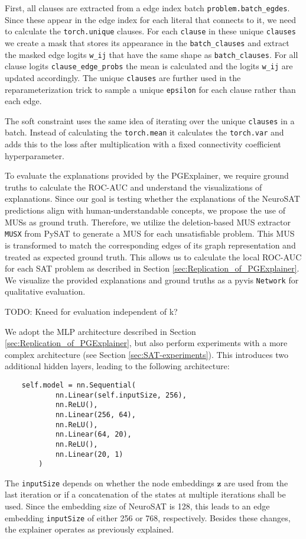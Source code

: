 First, all clauses are extracted from a edge index batch \verb|problem.batch_egdes|. Since these appear in the edge index for each literal that connects to it, we need to calculate the \verb|torch.unique| clauses. For each \verb|clause| in these unique \verb|clauses| we create a mask that stores its appearance in the \verb|batch_clauses| and extract the masked edge logits \verb|w_ij| that have the same shape as \verb|batch_clauses|. For all clause logits \verb|clause_edge_probs| the mean is calculated and the logits \verb|w_ij| are updated accordingly.
The unique \verb|clauses| are further used in the reparameterization trick to sample a unique \verb|epsilon| for each clause rather than each edge.

The soft constraint uses the same idea of iterating over the unique \verb|clauses| in a batch. Instead of calculating the \verb|torch.mean| it calculates the \verb|torch.var| and adds this to the loss after multiplication with a fixed connectivity coefficient hyperparameter. \bigskip

To evaluate the explanations provided by the PGExplainer, we require ground truths to calculate the ROC-AUC and understand the visualizations of explanations. Since our goal is testing whether the explanations of the NeuroSAT predictions align with human-understandable concepts, we propose the use of MUSs as ground truth. Therefore, we utilize the deletion-based MUS extractor \verb|MUSX| from PySAT \cite{imms-sat18} to generate a MUS for each unsatisfiable problem. This MUS is transformed to match the corresponding edges of its graph representation and treated as expected ground truth. This allows us to calculate the local ROC-AUC for each SAT problem as described in Section \ref{sec:Replication_of_PGExplainer}. We visualize the provided explanations and ground truths as a pyvis \cite{perrone2020network} \verb|Network| for qualitative evaluation. \bigskip

TODO: Kneed for evaluation independent of k?

We adopt the MLP architecture described in Section \ref{sec:Replication_of_PGExplainer}, but also perform experiments with a more complex architecture (see Section \ref{sec:SAT-experiments}). This introduces two additional hidden layers, leading to the following architecture:
\begin{verbatim}
    self.model = nn.Sequential(
            nn.Linear(self.inputSize, 256),
            nn.ReLU(),
            nn.Linear(256, 64),
            nn.ReLU(),
            nn.Linear(64, 20),
            nn.ReLU(),
            nn.Linear(20, 1)
        )
\end{verbatim}
The \verb|inputSize| depends on whether the node embeddings $\mathbf{z}$ are used from the last iteration or if a concatenation of the states at multiple iterations shall be used. Since the embedding size of NeuroSAT is 128, this leads to an edge embedding \verb|inputSize| of either 256 or 768, respectively. Besides these changes, the explainer operates as previously explained.